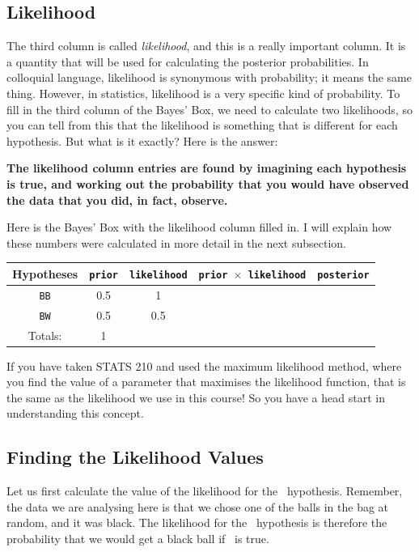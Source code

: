 \subsection{Likelihood}
The third column is called {\it likelihood}, and this is a really important
column. It is a quantity that will be used for calculating the posterior
probabilities. In colloquial language, likelihood is synonymous with
probability; it means the same thing. However, in statistics, likelihood is a
very
specific kind of probability. To fill in the third column of the Bayes' Box,
we need to calculate two likelihoods, so you can tell from this that the
likelihood is something that is different for each hypothesis. But what is it
exactly? Here is the answer:
\begin{framed}
{\bf The likelihood column entries are found by imagining each hypothesis
is true, and working out the probability
that you would have observed the data that you did, in fact, observe.}
\end{framed}

Here is the Bayes' Box with the likelihood column filled in. I will explain
how these numbers were calculated in more detail in the next subsection.
\begin{table}[h!]
\begin{center}
\begin{tabular}{|c|c|c|c|c|}
\hline
{\bf Hypotheses} & {\tt prior} & {\tt likelihood} &
{\tt prior $\times$ likelihood} & {\tt posterior}\\
\hline
{\tt BB} & 0.5 & 1 &  & \\
{\tt BW} & 0.5 & 0.5 &  & \\
\hline
Totals: & 1 & & & \\
\hline
\end{tabular}
\end{center}
\end{table}
If you have taken STATS 210 and used the maximum likelihood method, where you
find the value of a parameter that maximises the likelihood function, that is
the same as the likelihood we use in this course! So you have a head start
in understanding this concept.

\subsection{Finding the Likelihood Values}
Let us first calculate the value of the likelihood for the \bb~hypothesis.
Remember, the data we are analysing here is that we chose one of the balls in
the bag at random, and it was black. The likelihood for the \bb~hypothesis is
therefore the probability that we would get a black ball if \bb~is true.

